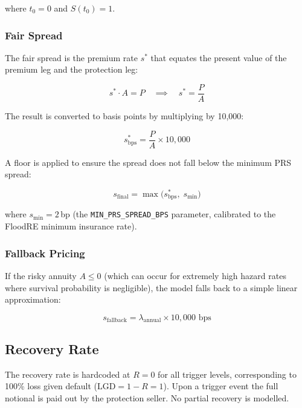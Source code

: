 \documentclass[11pt,a4paper]{article}
\begin{document}
\noindent where $t_0 = 0$ and $S(t_0) = 1$.

\subsubsection{Fair Spread}

The fair spread is the premium rate $s^*$ that equates the present value of the premium
leg and the protection leg:

\begin{equation}
    s^* \cdot A = P \quad \implies \quad s^* = \frac{P}{A}
    \label{eq:fair_spread}
\end{equation}

The result is converted to basis points by multiplying by 10{,}000:

\begin{equation}
    s^*_{\text{bps}} = \frac{P}{A} \times 10{,}000
    \label{eq:spread_bps}
\end{equation}

A floor is applied to ensure the spread does not fall below the minimum PRS spread:

\begin{equation}
    s_{\text{final}} = \max\!\big(s^*_{\text{bps}},\; s_{\text{min}}\big)
    \label{eq:spread_floor}
\end{equation}

\noindent where $s_{\text{min}} = 2$\,bp (the \texttt{MIN\_PRS\_SPREAD\_BPS} parameter,
calibrated to the FloodRE minimum insurance rate).

\subsubsection{Fallback Pricing}

If the risky annuity $A \leq 0$ (which can occur for extremely high hazard rates where
survival probability is negligible), the model falls back to a simple linear
approximation:

\begin{equation}
    s_{\text{fallback}} = \lambda_{\text{annual}} \times 10{,}000 \text{ bps}
\end{equation}

\subsection{Recovery Rate}

The recovery rate is hardcoded at $R = 0$ for all trigger levels, corresponding to
100\% loss given default ($\text{LGD} = 1 - R = 1$). Upon a trigger event the full
notional is paid out by the protection seller. No partial recovery is modelled.
\end{document}

